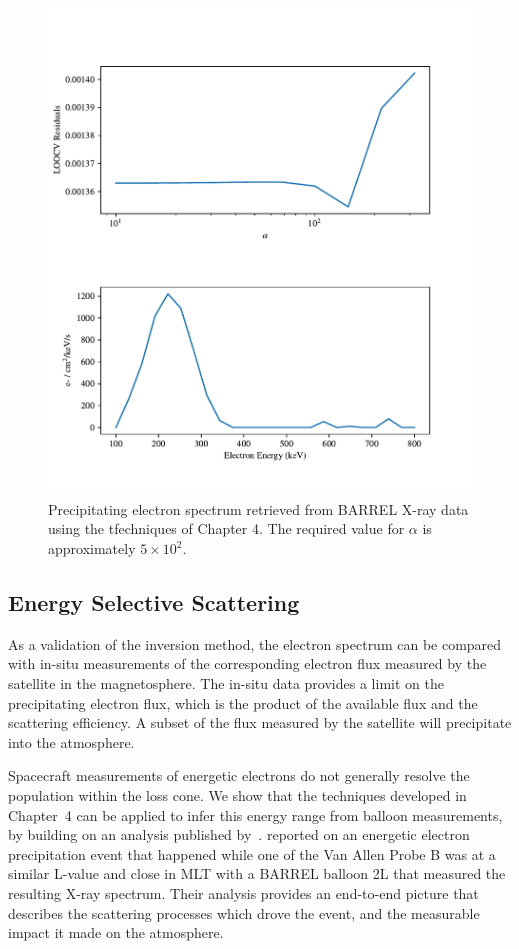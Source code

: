 \begin{figure}[p]
    \centering
    \includegraphics[width=1.0\textwidth]{figures/chapter_5/barrel_tk_inv/barrel_tk_inv}
    \caption{Precipitating electron spectrum retrieved from BARREL X-ray data using the tfechniques of Chapter 4. The required value for $\alpha$ is approximately $5\times10^2$.}
    \label{barrel_tk_inv_2}
\end{figure}

\subsection{Energy Selective Scattering}

As a validation of the inversion method, the electron spectrum can be compared with in-situ measurements of the corresponding electron flux measured by the satellite in the magnetosphere. The in-situ data provides a limit on the precipitating electron flux, which is the product of the available flux and the scattering efficiency. A subset of the flux measured by the satellite will precipitate into the atmosphere.  

Spacecraft measurements of energetic electrons do not generally resolve the population within the loss cone.  We show that the techniques developed in Chapter~4 can be applied to infer this energy range from balloon measurements, by building on an analysis published by~\citet{Halford2015}. \cite{Halford2015} reported on an energetic electron precipitation event that happened while one of the Van Allen Probe B was at a similar L-value and close in MLT with a BARREL balloon 2L that measured the resulting X-ray spectrum. Their analysis provides an end-to-end picture that describes the scattering processes which drove the event, and the measurable impact it made on the atmosphere.  

